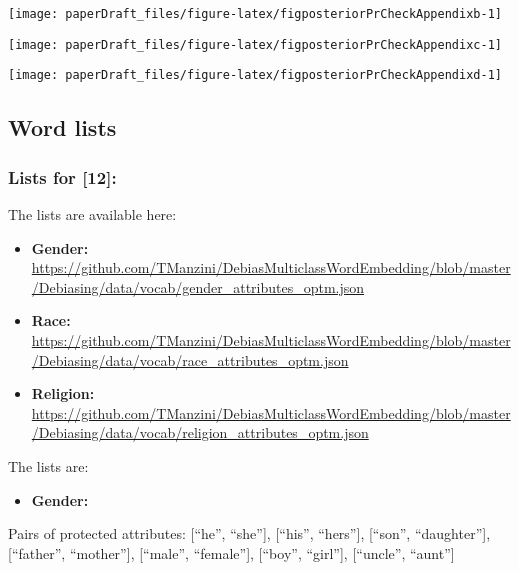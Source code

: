 \documentclass[
  12pt,
  dvipsnames,enabledeprecatedfontcommands]{scrartcl}
\providecommand{\tightlist}{%
  \setlength{\itemsep}{0pt}\setlength{\parskip}{0pt}}
\begin{document}
\begin{center}\texttt{[image: paperDraft\_files/figure-latex/figposteriorPrCheckAppendixb-1]} \end{center}

\begin{center}\texttt{[image: paperDraft\_files/figure-latex/figposteriorPrCheckAppendixc-1]} \end{center}

\begin{center}\texttt{[image: paperDraft\_files/figure-latex/figposteriorPrCheckAppendixd-1]} \end{center}

\hypertarget{word-lists}{%
\subsection{Word lists}\label{word-lists}}

\hypertarget{lists-for-manzini2019blacktocriminal}{%
\subsubsection{Lists for
{[}12{]}:}\label{lists-for-manzini2019blacktocriminal}}

\label{appendix:manzini_word_lists} The lists are available here:

\begin{itemize}
\item
  \textbf{Gender:}
  \url{https://github.com/TManzini/DebiasMulticlassWordEmbedding/blob/master/Debiasing/data/vocab/gender_attributes_optm.json}
\item
  \textbf{Race:}
  \url{https://github.com/TManzini/DebiasMulticlassWordEmbedding/blob/master/Debiasing/data/vocab/race_attributes_optm.json}
\item
  \textbf{Religion:}
  \url{https://github.com/TManzini/DebiasMulticlassWordEmbedding/blob/master/Debiasing/data/vocab/religion_attributes_optm.json}
\end{itemize}

The lists are:

\begin{itemize}
\tightlist
\item
  \textbf{Gender:}
\end{itemize}

Pairs of protected attributes: {[}``he'', ``she''{]}, {[}``his'',
``hers''{]}, {[}``son'', ``daughter''{]}, {[}``father'', ``mother''{]},
{[}``male'', ``female''{]}, {[}``boy'', ``girl''{]}, {[}``uncle'',
``aunt''{]}
\end{document}
